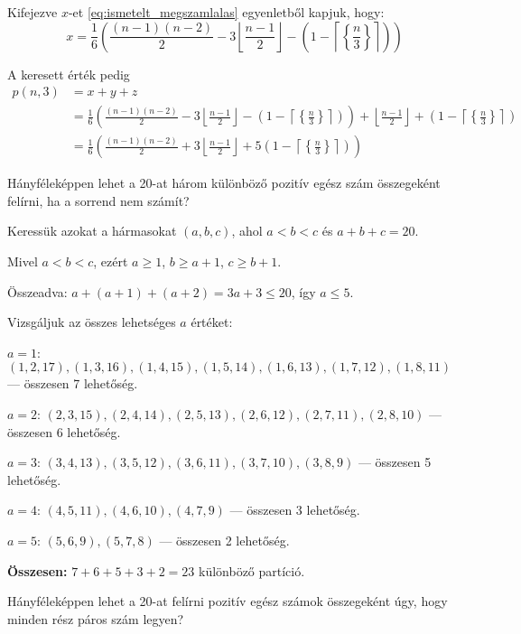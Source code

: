 \begin{solution}
Kifejezve $x$-et \ref{eq:ismetelt_megszamlalas} egyenletből kapjuk,
hogy: 
\[
x=\frac{1}{6}\left(\frac{(n-1)(n-2)}{2}-3\left\lfloor \frac{n-1}{2}\right\rfloor -\left(1-\left\lceil \left\{ \frac{n}{3}\right\} \right\rceil \right)\right)
\]

A keresett érték pedig 
\begin{align*}
p(n,3) & =x+y+z\\
 & =\frac{1}{6}\left(\frac{(n-1)(n-2)}{2}-3\left\lfloor \frac{n-1}{2}\right\rfloor -\left(1-\left\lceil \left\{ \frac{n}{3}\right\} \right\rceil \right)\right)+\left\lfloor \frac{n-1}{2}\right\rfloor +\left(1-\left\lceil \left\{ \frac{n}{3}\right\} \right\rceil \right)\\
 & =\frac{1}{6}\left(\frac{(n-1)(n-2)}{2}+3\left\lfloor \frac{n-1}{2}\right\rfloor +5\left(1-\left\lceil \left\{ \frac{n}{3}\right\} \right\rceil \right)\right)
\end{align*}
\end{solution}
\begin{extraproblem}
Hányféleképpen lehet a 20-at három különböző pozitív egész szám összegeként
felírni, ha a sorrend nem számít?
\end{extraproblem}
\bigskip{}

\begin{solution}
Keressük azokat a hármasokat $(a,b,c)$, ahol $a<b<c$ és $a+b+c=20$.

Mivel $a<b<c$, ezért $a\geq1$, $b\geq a+1$, $c\geq b+1$.

Összeadva: $a+(a+1)+(a+2)=3a+3\leq20$, így $a\leq5$.

Vizsgáljuk az összes lehetséges $a$ értéket:

$a=1$: $(1,2,17),(1,3,16),(1,4,15),(1,5,14),(1,6,13),(1,7,12),(1,8,11)$
--- összesen 7 lehetőség.

$a=2$: $(2,3,15),(2,4,14),(2,5,13),(2,6,12),(2,7,11),(2,8,10)$ ---
összesen 6 lehetőség.

$a=3$: $(3,4,13),(3,5,12),(3,6,11),(3,7,10),(3,8,9)$ --- összesen
5 lehetőség.

$a=4$: $(4,5,11),(4,6,10),(4,7,9)$ --- összesen 3 lehetőség.

$a=5$: $(5,6,9),(5,7,8)$ --- összesen 2 lehetőség.

\bigskip{}

\textbf{Összesen:} $7+6+5+3+2=23$ különböző partíció.
\end{solution}
\begin{extraproblem}
Hányféleképpen lehet a 20-at felírni pozitív egész számok összegeként
úgy, hogy minden rész páros szám legyen?
\end{extraproblem}
\bigskip{}


